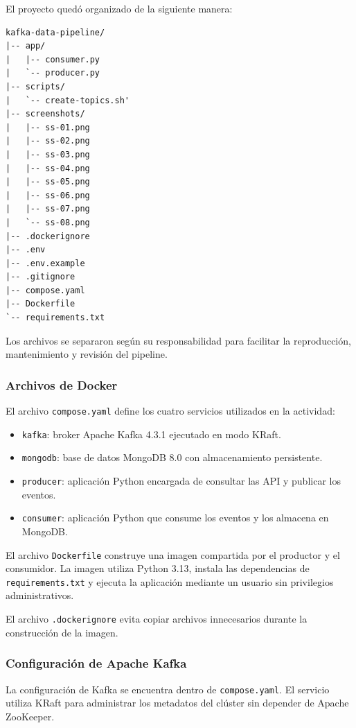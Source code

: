 El proyecto quedó organizado de la siguiente manera:

\begin{verbatim}
kafka-data-pipeline/
|-- app/
|   |-- consumer.py
|   `-- producer.py
|-- scripts/
|   `-- create-topics.sh'
|-- screenshots/
|   |-- ss-01.png
|   |-- ss-02.png
|   |-- ss-03.png
|   |-- ss-04.png
|   |-- ss-05.png
|   |-- ss-06.png
|   |-- ss-07.png
|   `-- ss-08.png
|-- .dockerignore
|-- .env
|-- .env.example
|-- .gitignore
|-- compose.yaml
|-- Dockerfile
`-- requirements.txt
\end{verbatim}

Los archivos se separaron según su responsabilidad para facilitar la
reproducción, mantenimiento y revisión del pipeline.

\subsubsection{Archivos de Docker}

El archivo \texttt{compose.yaml} define los cuatro servicios utilizados en la
actividad:

\begin{itemize}
    \item \texttt{kafka}: broker Apache Kafka 4.3.1 ejecutado en modo KRaft.
    \item \texttt{mongodb}: base de datos MongoDB 8.0 con almacenamiento
    persistente.
    \item \texttt{producer}: aplicación Python encargada de consultar las API
    y publicar los eventos.
    \item \texttt{consumer}: aplicación Python que consume los eventos y los
    almacena en MongoDB.
\end{itemize}

El archivo \texttt{Dockerfile} construye una imagen compartida por el productor
y el consumidor. La imagen utiliza Python 3.13, instala las dependencias de
\texttt{requirements.txt} y ejecuta la aplicación mediante un usuario sin
privilegios administrativos.

El archivo \texttt{.dockerignore} evita copiar archivos innecesarios durante la
construcción de la imagen.

\subsubsection{Configuración de Apache Kafka}

La configuración de Kafka se encuentra dentro de \texttt{compose.yaml}. El
servicio utiliza KRaft para administrar los metadatos del clúster sin depender
de Apache ZooKeeper.

